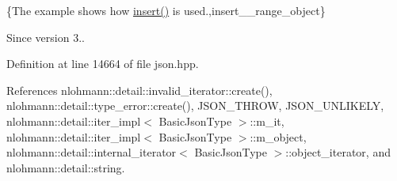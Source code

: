 \{The example shows how {\ttfamily \hyperlink{classnlohmann_1_1basic__json_a0136728f5db69d4051c77b94307abd6c}{insert()}} is used.,insert\+\_\+\+\_\+range\+\_\+object\}

\begin{DoxySince}{Since}
version 3.. 
\end{DoxySince}


Definition at line 14664 of file json.\+hpp.



References nlohmann\+::detail\+::invalid\+\_\+iterator\+::create(), nlohmann\+::detail\+::type\+\_\+error\+::create(), J\+S\+O\+N\+\_\+\+T\+H\+R\+OW, J\+S\+O\+N\+\_\+\+U\+N\+L\+I\+K\+E\+LY, nlohmann\+::detail\+::iter\+\_\+impl$<$ Basic\+Json\+Type $>$\+::m\+\_\+it, nlohmann\+::detail\+::iter\+\_\+impl$<$ Basic\+Json\+Type $>$\+::m\+\_\+object, nlohmann\+::detail\+::internal\+\_\+iterator$<$ Basic\+Json\+Type $>$\+::object\+\_\+iterator, and nlohmann\+::detail\+::string.


